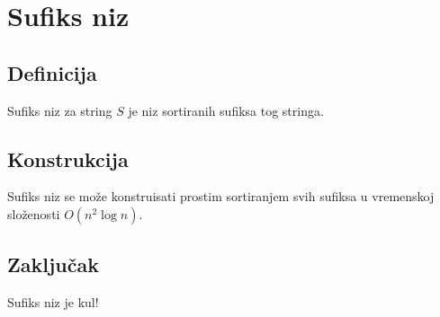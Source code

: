 \section{Sufiks niz}
\subsection{Definicija}
Sufiks niz za string $S$ je niz sortiranih sufiksa tog stringa.
\subsection{Konstrukcija}
Sufiks niz se mo\v ze konstruisati prostim sortiranjem svih sufiksa u vremenskoj slo\v zenosti $O(n^2 \log n)$.
\subsection{Zaklju\v cak}
Sufiks niz je kul!